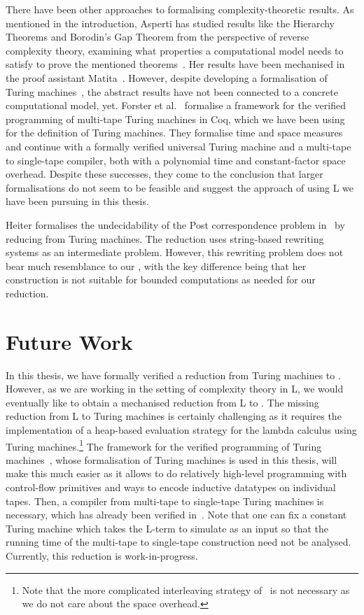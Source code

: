 There have been other approaches to formalising complexity-theoretic results. As mentioned in the introduction, Asperti has studied results like the Hierarchy Theorems and Borodin's Gap Theorem from the perspective of reverse complexity theory, examining what properties a computational model needs to satisfy to prove the mentioned theorems~\cite{asperti:reverse_complexity, asperti:borodin}. Her results have been mechanised in the proof assistant Matita~\cite{matita_web}. However, despite developing a formalisation of Turing machines~\cite{asperti_ricciotti}, the abstract results have not been connected to a concrete computational model, yet.
Forster et al.~\cite{ForsterEtAl:2019:VerifiedTMs} formalise a framework for the verified programming of multi-tape Turing machines in Coq, which we have been using for the definition of Turing machines. They formalise time and space measures and continue with a formally verified universal Turing machine and a multi-tape to single-tape compiler, both with a polynomial time and constant-factor space overhead. Despite these successes, they come to the conclusion that larger formalisations do not seem to be feasible and suggest the approach of using L we have been pursuing in this thesis.

Heiter formalises the undecidability of the Post correspondence problem in~\cite{heiter:pcp} by reducing from Turing machines. The reduction uses string-based rewriting systems as an intermediate problem. However, this rewriting problem does not bear much resemblance to our \PR{}, with the key difference being that her construction is not suitable for bounded computations as needed for our reduction.


\section{Future Work}
In this thesis, we have formally verified a reduction from Turing machines to \SAT{}. However, as we are working in the setting of complexity theory in L, we would eventually like to obtain a mechanised reduction from L to \SAT{}.
The missing reduction from L to Turing machines is certainly challenging as it requires the implementation of a heap-based evaluation strategy for the lambda calculus using Turing machines.\footnote{Note that the more complicated interleaving strategy of~\cite{ForsterKunzeRoth:2019:wcbv-Reasonable} is not necessary as we do not care about the space overhead.} The framework for the verified programming of Turing machines~\cite{ForsterEtAl:2019:VerifiedTMs}, whose formalisation of Turing machines is used in this thesis, will make this much easier as it allows to do relatively high-level programming with control-flow primitives and ways to encode inductive datatypes on individual tapes.
Then, a compiler from multi-tape to single-tape Turing machines is necessary, which has already been verified in~\cite{ForsterEtAl:2019:VerifiedTMs}. Note that one can fix a constant Turing machine which takes the L-term to simulate as an input so that the running time of the multi-tape to single-tape construction need not be analysed.
Currently, this reduction is work-in-progress.

